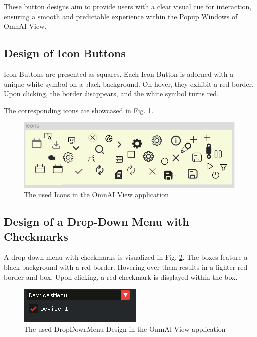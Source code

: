 \documentclass[]{scrreprt}
\begin{document}
These button designs aim to provide users with a clear visual cue for interaction, ensuring a smooth and predictable experience within the Popup Windows of OmnAI View.

\subsection{Design of Icon Buttons}

Icon Buttons are presented as squares. Each Icon Button is adorned with a unique white symbol on a black background. On hover, they exhibit a red border. Upon clicking, the border disappears, and the white symbol turns red.

The corresponding icons are showcased in Fig. \ref{fig: IconImages}.

\begin{figure}
    \includegraphics[width=.7\textwidth]{assets/pictures/Icons.png}
    \caption[]{The used Icons in the OmnAI View application}
    \label{fig: IconImages}
\end{figure}

\subsection{Design of a Drop-Down Menu with Checkmarks}

A drop-down menu with checkmarks is visualized in Fig. \ref{fig: DragandDropwithCheckmarks}. The boxes feature a black background with a red border. Hovering over them results in a lighter red border and box. Upon clicking, a red checkmark is displayed within the box.

\begin{figure}
    \includegraphics[width=.5\textwidth]{assets/pictures/DropDownMenu.png}
    \caption[]{The used DropDownMenu Design in the OmnAI View application}
    \label{fig: DragandDropwithCheckmarks}
\end{figure}
\end{document}
